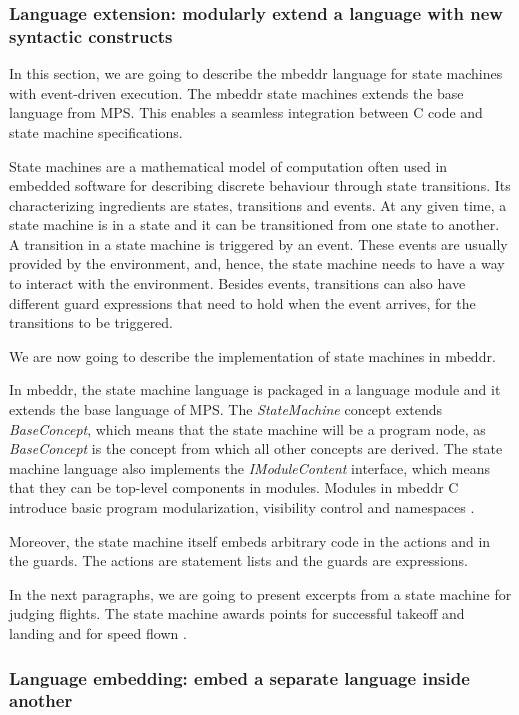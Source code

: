 \documentclass[preprint,numbers,10pt]{sigplanconf}
\begin{document}
\subsubsection{Language extension: modularly extend a language with new syntactic constructs}

In this section, we are going to describe the mbeddr language for state
machines with event-driven execution. The mbeddr state machines extends
the base language from MPS. This enables a seamless integration between
C code and state machine specifications.

State machines are a mathematical model of computation often used in embedded software
for describing discrete behaviour through state transitions. Its characterizing
ingredients are states, transitions and events. At any given time, a state
machine is in a state and it can be transitioned from one state to another.
A transition in a state machine is triggered by an event. These events
are usually provided by the environment, and, hence, the state machine
needs to have a way to interact with the environment. Besides events,
transitions can also have different guard expressions that need to hold when
the event arrives, for the transitions to be triggered.

We are now going to describe the implementation of state machines in mbeddr.

In mbeddr, the state machine language is packaged in a language module and it
extends the base language of MPS. The \emph{StateMachine} concept extends
\emph{BaseConcept}, which means that the state machine will be a program node,
as \emph{BaseConcept} is the concept from which all other concepts are derived.
The state machine language also implements the \emph{IModuleContent} interface,
which means that they can be top-level components in modules. Modules in mbeddr C
introduce basic program modularization, visibility control and namespaces \cite{voelter2013mbeddr}.

Moreover, the state machine itself embeds arbitrary code in the actions
and in the guards. The actions are statement lists and the guards are expressions.

In the next paragraphs, we are going to present excerpts from a state machine for
judging flights. The state machine awards points for successful
takeoff and landing and for speed flown \cite{voelter2014generic}.

\subsubsection{Language embedding: embed a separate language inside another}
\end{document}
